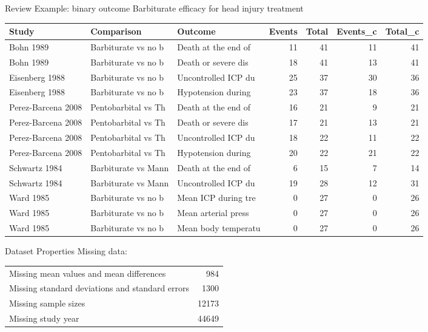 \documentclass[english]{beamer}\usepackage[]{graphicx}\usepackage[]{color}
\begin{document}
\begin{frame}[fragile]{Review Example: binary outcome}
Barbiturate efficacy for head injury treatment
\vspace{-5mm}
\begin{table}[ht]
\centering
\begingroup\tiny
\begin{tabular}{lllrrrr}
  \hline
Study & Comparison & Outcome & Events & Total & Events\_c & Total\_c \\ 
  \hline
Bohn 1989 & Barbiturate vs no b & Death at the end of & 11 & 41 & 11 & 41 \\ 
  Bohn 1989 & Barbiturate vs no b & Death or severe dis & 18 & 41 & 13 & 41 \\ 
  Eisenberg 1988 & Barbiturate vs no b & Uncontrolled ICP du & 25 & 37 & 30 & 36 \\ 
  Eisenberg 1988 & Barbiturate vs no b & Hypotension during  & 23 & 37 & 18 & 36 \\ 
  Perez-Barcena 2008 & Pentobarbital vs Th & Death at the end of & 16 & 21 & 9 & 21 \\ 
  Perez-Barcena 2008 & Pentobarbital vs Th & Death or severe dis & 17 & 21 & 13 & 21 \\ 
  Perez-Barcena 2008 & Pentobarbital vs Th & Uncontrolled ICP du & 18 & 22 & 11 & 22 \\ 
  Perez-Barcena 2008 & Pentobarbital vs Th & Hypotension during  & 20 & 22 & 21 & 22 \\ 
  Schwartz 1984 & Barbiturate vs Mann & Death at the end of & 6 & 15 & 7 & 14 \\ 
  Schwartz 1984 & Barbiturate vs Mann & Uncontrolled ICP du & 19 & 28 & 12 & 31 \\ 
  Ward 1985 & Barbiturate vs no b & Mean ICP during tre & 0 & 27 & 0 & 26 \\ 
  Ward 1985 & Barbiturate vs no b & Mean arterial press & 0 & 27 & 0 & 26 \\ 
  Ward 1985 & Barbiturate vs no b & Mean body temperatu & 0 & 27 & 0 & 26 \\ 
   \hline
\end{tabular}
\endgroup
\label{barbiturates}
\end{table}

\end{frame}


\begin{frame}[fragile]{Dataset Properties}
Missing data:
\begin{table}[ht]
\centering
\begin{tabular}{lr}
  \hline
  \hline
Missing mean values and mean differences & 984 \\ 
  Missing standard deviations and standard errors & 1300 \\ 
  Missing sample sizes & 12173 \\ 
  Missing study year & 44649 \\ 
   \hline
\end{tabular}
\end{table}

\end{frame}
\end{document}
